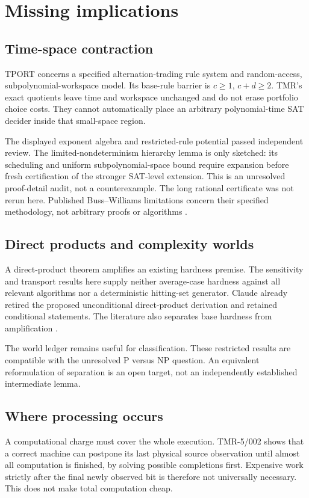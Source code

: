 \documentclass[11pt]{article}
\begin{document}
\section{Missing implications}
\subsection{Time-space contraction}
TPORT concerns a specified alternation-trading rule system and random-access, subpolynomial-workspace model. Its base-rule barrier is \(c\ge1\), \(c+d\ge2\). TMR's exact quotients leave time and workspace unchanged and do not erase portfolio choice costs. They cannot automatically place an arbitrary polynomial-time SAT decider inside that small-space region.

The displayed exponent algebra and restricted-rule potential passed independent review. The limited-nondeterminism hierarchy lemma is only sketched: its scheduling and uniform subpolynomial-space bound require expansion before fresh certification of the stronger SAT-level extension. This is an unresolved proof-detail audit, not a counterexample. The long rational certificate was not rerun here. Published Buss--Williams limitations concern their specified methodology, not arbitrary proofs or algorithms \cite{bw}.

\subsection{Direct products and complexity worlds}
A direct-product theorem amplifies an existing hardness premise. The sensitivity and transport results here supply neither average-case hardness against all relevant algorithms nor a deterministic hitting-set generator. Claude already retired the proposed unconditional direct-product derivation and retained conditional statements. The literature also separates base hardness from amplification \cite{dp}.

The world ledger remains useful for classification. These restricted results are compatible with the unresolved P versus NP question. An equivalent reformulation of separation is an open target, not an independently established intermediate lemma.

\subsection{Where processing occurs}
A computational charge must cover the whole execution. TMR-5/002 shows that a correct machine can postpone its last physical source observation until almost all computation is finished, by solving possible completions first. Expensive work strictly after the final newly observed bit is therefore not universally necessary. This does not make total computation cheap.
\end{document}
